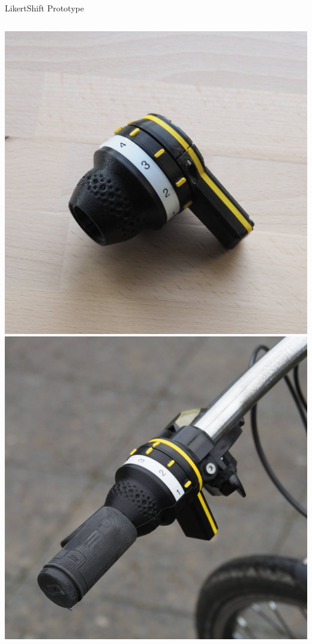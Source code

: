 \documentclass[
    english,
    accentcolor=9c,
    design=2023,
    logofile=images/hulogo.pdf,
]{tudabeamer}
\begin{document}
\begin{frame}{LikertShift Prototype}
    \begin{columns}[onlytextwidth,c]
        \centering
        \includegraphics[height=0.7\linewidth]{../images/likertshift_assembled.jpg}
        \centering
        \includegraphics[height=0.7\linewidth]{../images/likertshift_mounted.jpg}
    \end{columns}
\end{frame}
\end{document}
